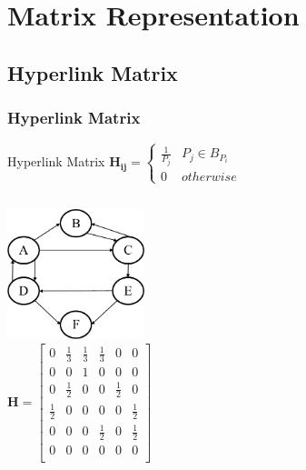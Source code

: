 \documentclass{beamer}
\begin{document}

\section{Matrix Representation}
\subsection{Hyperlink Matrix}
\begin{frame}
\frametitle{Hyperlink Matrix}
\begin{block}{Hyperlink Matrix}
$\boldsymbol{H_{ij}} = \begin{cases} \frac{1}{P_j} & P_j\in B_{P_i } \\ 0 & otherwise\end{cases} $
\end{block}
\begin{example}
\begin{columns}[c]
\includegraphics[width=4cm]{Picture2.png}
\[\textbf{H} = \left[
\begin{array}{cccccc}
0 & \frac{1}{3} & \frac{1}{3} &\frac{1}{3} & 0& 0 \\
0 & 0 & 1 & 0 & 0 & 0\\
0 & \frac{1}{2} & 0 & 0 & \frac{1}{2} & 0\\
\frac{1}{2} & 0 & 0 & 0 & 0 & \frac{1}{2}\\
0 & 0 & 0 & \frac{1}{2} & 0 &\frac{1}{2} \\
0 & 0 & 0 & 0 & 0 & 0 \\
\end{array}
\right]	
\]

\end{columns}
\end{example}
\end{frame}

\end{document}
